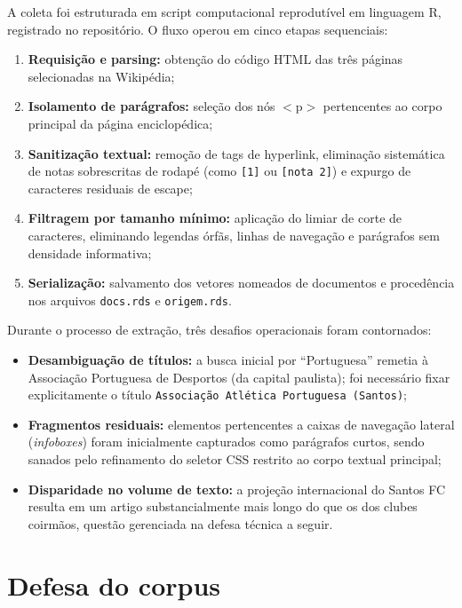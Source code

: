 \documentclass[
  article,
  12pt,
  oneside,
  a4paper,
  english,
  brazil
]{abntex2}\usepackage[]{graphicx}\usepackage[]{xcolor}
\begin{document}
A coleta foi estruturada em script computacional reprodutível em linguagem R, registrado no repositório. O fluxo operou em cinco etapas sequenciais:
\begin{enumerate}
  \item \textbf{Requisição e parsing:} obtenção do código HTML das três páginas selecionadas na Wikipédia;
  \item \textbf{Isolamento de parágrafos:} seleção dos nós $<\!\text{p}\!>$ pertencentes ao corpo principal da página enciclopédica;
  \item \textbf{Sanitização textual:} remoção de tags de hyperlink, eliminação sistemática de notas sobrescritas de rodapé (como \texttt{[1]} ou \texttt{[nota 2]}) e expurgo de caracteres residuais de escape;
  \item \textbf{Filtragem por tamanho mínimo:} aplicação do limiar de corte de  caracteres, eliminando legendas órfãs, linhas de navegação e parágrafos sem densidade informativa;
  \item \textbf{Serialização:} salvamento dos vetores nomeados de documentos e procedência nos arquivos \texttt{docs.rds} e \texttt{origem.rds}.
\end{enumerate}

Durante o processo de extração, três desafios operacionais foram contornados:
\begin{itemize}
  \item \textbf{Desambiguação de títulos:} a busca inicial por ``Portuguesa'' remetia à Associação Portuguesa de Desportos (da capital paulista); foi necessário fixar explicitamente o título \texttt{Associação Atlética Portuguesa (Santos)};
  \item \textbf{Fragmentos residuais:} elementos pertencentes a caixas de navegação lateral (\emph{infoboxes}) foram inicialmente capturados como parágrafos curtos, sendo sanados pelo refinamento do seletor CSS restrito ao corpo textual principal;
  \item \textbf{Disparidade no volume de texto:} a projeção internacional do Santos FC resulta em um artigo substancialmente mais longo do que os dos clubes coirmãos, questão gerenciada na defesa técnica a seguir.
\end{itemize}

\section{Defesa do corpus}
\end{document}
